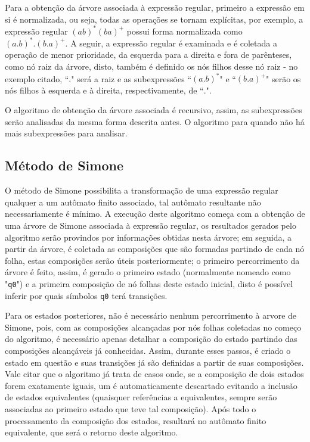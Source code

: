 \documentclass{article}
\begin{document}
            Para a obtenção da árvore associada à expressão regular, primeiro a
            expressão em si é normalizada, ou seja, todas as operações se
            tornam explícitas, por exemplo, a expressão regular
            $(ab)^{*}(ba)^{+}$ possui forma normalizada como
            $(a.b)^{*}.(b.a)^{+}$. A seguir, a expressão regular é examinada e
            é coletada a operação de menor prioridade, da esquerda para a
            direita e fora de parênteses, como nó raiz da árvore, disto, também
            é definido os nós filhos desse nó raiz - no exemplo citado, ``$.$"
            será a raiz e as subexpressões ``$(a.b)^{*}$" e ``$(b.a)^{+}$"
            serão os nós filhos à esquerda e à direita, respectivamente, de
            ``$.$".

            O algoritmo de obtenção da árvore associada é recursivo, assim, as
            subexpressões serão analisadas da mesma forma descrita antes. O
            algoritmo para quando não há mais subexpressões para analisar.

        \subsection{Método de Simone}
        \label{subsec:desimone}
            O método de Simone possibilita a transformação de uma expressão
            regular qualquer a um autômato finito associado, tal autômato
            resultante não necessariamente é mínimo. A execução deste algoritmo
            começa com a obtenção de uma árvore de Simone associada à expressão
            regular, os resultados gerados pelo algoritmo serão provindos por
            informações obtidas nesta árvore; em seguida, a partir da árvore, é
            coletada as composições que são formadas partindo de cada nó folha,
            estas composições serão úteis posteriormente; o primeiro
            percorrimento da árvore é feito, assim, é gerado o primeiro estado
            (normalmente nomeado como "\texttt{q0}") e a primeira composição de
            nó folhas deste estado inicial, disto é possível inferir por quais
            símbolos \texttt{q0} terá transições.

            Para os estados posteriores, não é necessário nenhum percorrimento
            à arvore de Simone, pois, com as composições alcançadas por nós
            folhas coletadas no começo do algoritmo, é necessário apenas
            detalhar a composição do estado partindo das composições
            alcançáveis já conhecidas. Assim, durante esses passos, é criado o
            estado em questão e suas transições já são definidas a partir de
            suas composições. Vale citar que o algoritmo já trata de casos
            onde, se a composição de dois estados forem exatamente iguais, um é
            automaticamente descartado evitando a inclusão de estados
            equivalentes (quaisquer referências a equivalentes, sempre serão
            associadas ao primeiro estado que teve tal composição). Após todo o
            processamento da composição dos estados, resultará no autômato
            finito equivalente, que será o retorno deste algoritmo.
\end{document}
